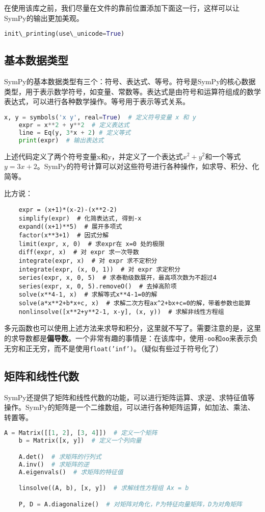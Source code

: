 \documentclass[../main.tex]{subfiles}
\begin{document}
在使用该库之前，我们尽量在文件的靠前位置添加下面这一行，这样可以让SymPy的输出更加美观。
\begin{lstlisting}[language=python]
  init\_printing(use\_unicode=True)
\end{lstlisting}

\subsection{基本数据类型}
SymPy的基本数据类型有三个：符号、表达式、等号。符号是SymPy的核心数据类型，用于表示数学符号，如变量、常数等。表达式是由符号和运算符组成的数学表达式，可以进行各种数学操作。等号用于表示等式关系。
\begin{lstlisting}[language=python]
    x, y = symbols('x y', real=True)  # 定义符号变量 x 和 y
    expr = x**2 + y**2  # 定义表达式
    line = Eq(y, 3*x + 2) # 定义等式
    print(expr)  # 输出表达式
\end{lstlisting}
上述代码定义了两个符号变量x和y，并定义了一个表达式$x^2 + y^2$和一个等式$y = 3x + 2$。SymPy的符号计算可以对这些符号进行各种操作，如求导、积分、化简等。

比方说：
\begin{lstlisting}
    expr = (x+1)*(x-2)-(x**2-2)
    simplify(expr)  # 化简表达式, 得到-x
    expand((x+1)**5)  # 展开多项式
    factor(x**3+1)  # 因式分解
    limit(expr, x, 0)  # 求expr在 x=0 处的极限
    diff(expr, x)  # 对 expr 求一次导数
    integrate(expr, x)  # 对 expr 求不定积分
    integrate(expr, (x, 0, 1))  # 对 expr 求定积分
    series(expr, x, 0, 5)  # 求泰勒级数展开，最高项次数为不超过4
    series(expr, x, 0, 5).removeO()  # 去掉高阶项
    solve(x**4-1, x)  # 求解等式x**4-1=0的解
    solve(a*x**2+b*x+c, x)  # 求解二次方程ax^2+bx+c=0的解，带着参数也能算
    nonlinsolve([x**2+y**2-1, x-y], (x, y))  # 求解非线性方程组
\end{lstlisting}

多元函数也可以使用上述方法来求导和积分，这里就不写了。需要注意的是，这里的求导数都是\textbf{偏导数}。一个非常有趣的事情是：在该库中，使用\texttt{-oo}和\texttt{oo}来表示负无穷和正无穷，而不是使用\texttt{float('inf')}。（疑似有些过于符号化了）

\subsection{矩阵和线性代数}
SymPy还提供了矩阵和线性代数的功能，可以进行矩阵运算、求逆、求特征值等操作。SymPy的矩阵是一个二维数组，可以进行各种矩阵运算，如加法、乘法、转置等。
\begin{lstlisting}[language=python]
    A = Matrix([[1, 2], [3, 4]])  # 定义一个矩阵
    b = Matrix([x, y])  # 定义一个列向量

    A.det()  # 求矩阵的行列式
    A.inv()  # 求矩阵的逆
    A.eigenvals()  # 求矩阵的特征值

    linsolve((A, b), [x, y])  # 求解线性方程组 Ax = b

    P, D = A.diagonalize()  # 对矩阵对角化，P为特征向量矩阵，D为对角矩阵
\end{lstlisting}
\end{document}
